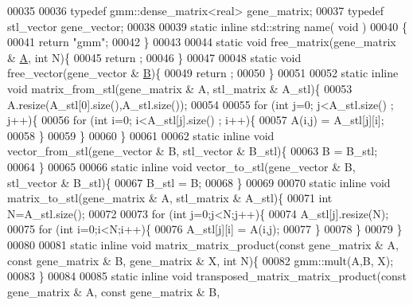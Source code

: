 \begin{DoxyCode}
00035 
00036   \textcolor{keyword}{typedef} gmm::dense\_matrix<real> gene\_matrix;
00037   \textcolor{keyword}{typedef} stl\_vector gene\_vector;
00038 
00039   \textcolor{keyword}{static} \textcolor{keyword}{inline} std::string name( \textcolor{keywordtype}{void} )
00040   \{
00041     \textcolor{keywordflow}{return} \textcolor{stringliteral}{"gmm"};
00042   \}
00043 
00044   \textcolor{keyword}{static} \textcolor{keywordtype}{void} free\_matrix(gene\_matrix & \hyperlink{group___core___module_class_eigen_1_1_matrix}{A}, \textcolor{keywordtype}{int} N)\{
00045     return ;
00046   \}
00047 
00048   \textcolor{keyword}{static} \textcolor{keywordtype}{void} free\_vector(gene\_vector & \hyperlink{group___core___module_class_eigen_1_1_matrix}{B})\{
00049     return ;
00050   \}
00051 
00052   \textcolor{keyword}{static} \textcolor{keyword}{inline} \textcolor{keywordtype}{void} matrix\_from\_stl(gene\_matrix & A, stl\_matrix & A\_stl)\{
00053     A.resize(A\_stl[0].size(),A\_stl.size());
00054 
00055     \textcolor{keywordflow}{for} (\textcolor{keywordtype}{int} j=0; j<A\_stl.size() ; j++)\{
00056       \textcolor{keywordflow}{for} (\textcolor{keywordtype}{int} i=0; i<A\_stl[j].size() ; i++)\{
00057         A(i,j) = A\_stl[j][i];
00058       \}
00059     \}
00060   \}
00061 
00062   \textcolor{keyword}{static} \textcolor{keyword}{inline} \textcolor{keywordtype}{void} vector\_from\_stl(gene\_vector & B, stl\_vector & B\_stl)\{
00063     B = B\_stl;
00064   \}
00065 
00066   \textcolor{keyword}{static} \textcolor{keyword}{inline} \textcolor{keywordtype}{void} vector\_to\_stl(gene\_vector & B, stl\_vector & B\_stl)\{
00067     B\_stl = B;
00068   \}
00069 
00070   \textcolor{keyword}{static} \textcolor{keyword}{inline} \textcolor{keywordtype}{void} matrix\_to\_stl(gene\_matrix & A, stl\_matrix & A\_stl)\{
00071     \textcolor{keywordtype}{int} N=A\_stl.size();
00072 
00073     \textcolor{keywordflow}{for} (\textcolor{keywordtype}{int} j=0;j<N;j++)\{
00074       A\_stl[j].resize(N);
00075       \textcolor{keywordflow}{for} (\textcolor{keywordtype}{int} i=0;i<N;i++)\{
00076         A\_stl[j][i] = A(i,j);
00077       \}
00078     \}
00079   \}
00080 
00081   \textcolor{keyword}{static} \textcolor{keyword}{inline} \textcolor{keywordtype}{void} matrix\_matrix\_product(\textcolor{keyword}{const} gene\_matrix & A, \textcolor{keyword}{const} gene\_matrix & B, gene\_matrix & X, \textcolor{keywordtype}{
      int} N)\{
00082     gmm::mult(A,B, X);
00083   \}
00084 
00085   \textcolor{keyword}{static} \textcolor{keyword}{inline} \textcolor{keywordtype}{void} transposed\_matrix\_matrix\_product(\textcolor{keyword}{const} gene\_matrix & A, \textcolor{keyword}{const} gene\_matrix & B, 

\end{DoxyCode}
